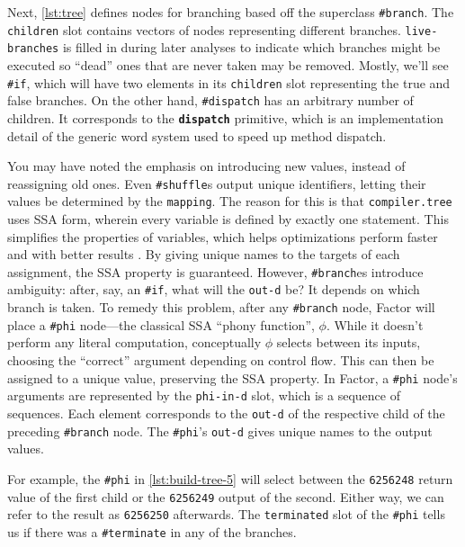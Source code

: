 

\begin{sloppypar}
Next, \vref{lst:tree} defines nodes for branching based off the superclass
\Verb|#branch|.  The \Verb|children| slot contains vectors of nodes
representing different branches.  \Verb|live-branches| is filled in during
later analyses to indicate which branches might be executed so ``dead'' ones
that are never taken may be removed.  Mostly, we'll see \Verb|#if|, which will
have two elements in its \Verb|children| slot representing the true and false
branches.  On the other hand, \Verb|#dispatch| has an arbitrary number of
children.  It corresponds to the \texttt{\textbf{dispatch}} primitive, which is
an implementation detail of the generic word system used to speed up method
dispatch.
\end{sloppypar}

You may have noted the emphasis on introducing new values, instead of
reassigning old ones.  Even \Verb|#shuffle|s output unique identifiers, letting
their values be determined by the \Verb|mapping|.  The reason for this is that
\Verb|compiler.tree| uses \gls{SSA} form, wherein every variable is defined by
exactly one statement.  This simplifies the properties of variables, which
helps optimizations perform faster and with better results \autocite{SSA}.  By
giving unique names to the targets of each assignment, the \gls{SSA} property
is guaranteed.  However, \Verb|#branch|es introduce ambiguity: after, say, an
\Verb|#if|, what will the \Verb|out-d| be?  It depends on which branch is
taken.  To remedy this problem, after any \Verb|#branch| node, Factor will
place a \Verb|#phi| node---the classical \gls{SSA} ``phony function'', $\phi$.
While it doesn't perform any literal computation, conceptually $\phi$ selects
between its inputs, choosing the ``correct'' argument depending on control
flow.  This can then be assigned to a unique value, preserving the \gls{SSA}
property.  In Factor, a \Verb|#phi| node's arguments are represented by the
\Verb|phi-in-d| slot, which is a sequence of sequences.  Each element
corresponds to the \Verb|out-d| of the respective child of the preceding
\Verb|#branch| node.  The \Verb|#phi|'s \Verb|out-d| gives unique names to the
output values.

For example, the \Verb|#phi| in \vref{lst:build-tree-5} will select between
the \Verb|6256248| return value of the first child or the \Verb|6256249|
output of the second.  Either way, we can refer to the result as
\Verb|6256250| afterwards.  The \Verb|terminated| slot of the \Verb|#phi|
tells us if there was a \Verb|#terminate| in any of the branches.

